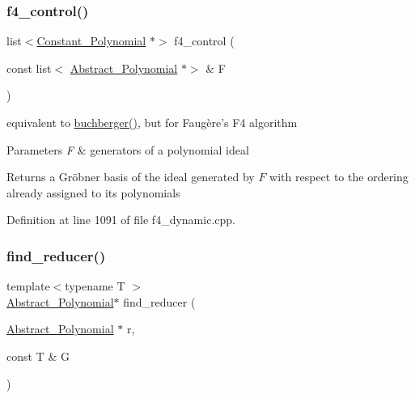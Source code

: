 \mbox{\label{group___g_b_computation_ga24647e1e20f18283bc931e723ba9fc22}} 
\subsubsection{\texorpdfstring{f4\+\_\+control()}{f4\_control()}}
{\footnotesize\ttfamily list$<$\hyperlink{group__polygroup_class_constant___polynomial}{Constant\+\_\+\+Polynomial} $\ast$$>$ f4\+\_\+control (\begin{DoxyParamCaption}\item[{const list$<$ \hyperlink{group__polygroup_class_abstract___polynomial}{Abstract\+\_\+\+Polynomial} $\ast$$>$ \&}]{F }\end{DoxyParamCaption})}



equivalent to {\ttfamily \hyperlink{group___g_b_computation_ga37aa7e2fec96fac6c914934a4243f603}{buchberger()}}, but for Faug\`{e}re's F4 algorithm 


\begin{DoxyParams}{Parameters}
{\em F} & generators of a polynomial ideal \\
\hline
\end{DoxyParams}
\begin{DoxyReturn}{Returns}
a Gr\"{o}bner basis of the ideal generated by $ F $ with respect to the ordering already assigned to its polynomials 
\end{DoxyReturn}


Definition at line 1091 of file f4\+\_\+dynamic.\+cpp.

\mbox{\label{group___g_b_computation_ga5a0f37dcb4ac73e553793fd627941c48}} 
\subsubsection{\texorpdfstring{find\+\_\+reducer()}{find\_reducer()}}
{\footnotesize\ttfamily template$<$typename T $>$ \\
\hyperlink{group__polygroup_class_abstract___polynomial}{Abstract\+\_\+\+Polynomial}$\ast$ find\+\_\+reducer (\begin{DoxyParamCaption}\item[{\hyperlink{group__polygroup_class_abstract___polynomial}{Abstract\+\_\+\+Polynomial} $\ast$}]{r,  }\item[{const T \&}]{G }\end{DoxyParamCaption})}



